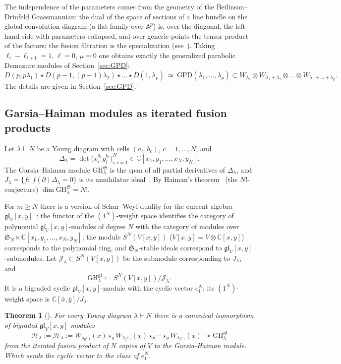 \documentclass[11pt]{amsart}
\numberwithin{equation}{section}
\newtheorem{theorem}[equation]{Theorem}
\theoremstyle{definition}
\newcommand{\gl}{\mathfrak{gl}}
\newcommand{\GPD}{\mathrm{GPD}}         %
\newcommand{\GH}{\mathrm{GH}}         %
\newcommand{\eps}{\varepsilon}
\newcommand{\bx}{\bar{x}}
\newcommand{\by}{\bar{y}}
\newcommand{\cJ}{\mathcal{J}}
\begin{document}
	The independence of the parameters comes from the geometry of the Beilinson--Drinfeld Grassmannian: the dual of the space of sections of a line bundle on the global convolution diagram (a flat family over $\mathbb A^p$) is, over the diagonal, the left-hand side with parameters collapsed, and over generic points the tensor product of the factors; the fusion filtration is the specialization (see~\cite[Thm.~2.1]{D}). Taking $\ell_i-\ell_{i+1}=1$, $\ell=0$, $\mu=0$ one obtains exactly the generalized parabolic Demazure modules of Section~\ref{sec:GPD}:
	\[
	D(p,p\lambda_1)\star D(p-1,(p-1)\lambda_2)\star\dots\star D(1,\lambda_p)\ \simeq\ \GPD(\lambda_1,\dots,\lambda_p)\subset W_{\lambda_1}\otimes W_{\lambda_1+\lambda_2}\otimes\dots\otimes W_{\lambda_1+\dots+\lambda_p}.
	\]
	The details are given in Section~\ref{sec:GPD}.
	
	\subsection{Garsia--Haiman modules as iterated fusion products}\label{ssec:GH-fusion}
	
	Let $\lambda\vdash N$ be a Young diagram with cells $(a_c,b_c)$, $c=1,\dots,N$, and
	\[
	\Delta_\lambda=\det\big(x_i^{a_c}y_i^{b_c}\big)_{i,c=1}^N\in\mathbb{C}[x_1,y_1,\dots,x_N,y_N].
	\]
	The Garsia--Haiman module $\GH^{\mathfrak S}_\lambda$ is the span of all partial derivatives of $\Delta_\lambda$, and $J_\lambda=\{f:\ f(\partial)\Delta_\lambda=0\}$ is its annihilator ideal~\cite{GH}. By Haiman's theorem~\cite{Haiman} (the $N!$-conjecture) $\dim\GH^{\mathfrak S}_\lambda=N!$.
	
	For $m\ge N$ there is a version of Schur--Weyl duality for the current algebra $\gl_V[x,y]$~\cite[\S3]{KM}: the functor of the $(1^N)$-weight space identifies the category of polynomial $\gl_V[x,y]$-modules of degree $N$ with the category of modules over $\mathfrak S_N\ltimes\mathbb{C}[x_1,y_1,\dots,x_N,y_N]$; the module $S^N(V[x,y])$ ($V[x,y]=V\otimes\mathbb{C}[x,y]$) corresponds to the polynomial ring, and $\mathfrak S_N$-stable ideals correspond to $\gl_V[x,y]$-submodules. Let $\cJ_\lambda\subset S^N(V[x,y])$ be the submodule corresponding to $J_\lambda$, and
	\[
	\GH^{\gl}_\lambda:=S^N(V[x,y])/\cJ_\lambda .
	\]
	It is a bigraded cyclic $\gl_V[x,y]$-module with the cyclic vector $e_1^N$; its $(1^N)$-weight space is $\mathbb{C}[\bx,\by]/J_\lambda$. 
	
	\begin{theorem}[{\cite[Theorem A]{KM}}]\label{thm:GH-fusion}
		For every Young diagram $\lambda\vdash N$ there is a canonical isomorphism of bigraded $\gl_V[x,y]$-modules 
		$$\mathcal H_\lambda:= 
		\mathcal H_\lambda:=W_{\lambda_0\eps_1}(x)\star_yW_{\lambda_1\eps_1}(x)\star_y\cdots\star_yW_{\lambda_l\eps_1}(x)
		\twoheadrightarrow\GH^{\gl}_\lambda$$
		from the iterated fusion product of $N$ copies of $V$ to the Garsia-Haiman module.
		Which sends the cyclic vector to the class of $e_1^N$.
	\end{theorem}
	
\end{document}
